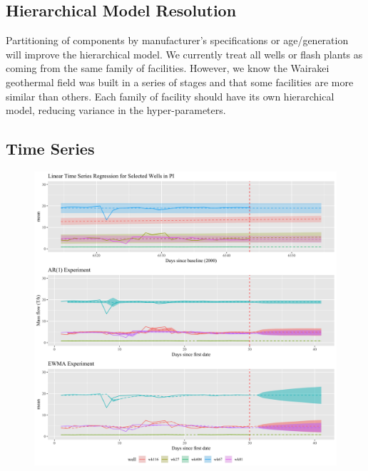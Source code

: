 \documentclass[a4paper, 12pt]{article}
\begin{document}
\subsection{Hierarchical Model Resolution}
Partitioning of components by manufacturer's specifications or age/generation will improve the hierarchical model. We currently treat all wells or flash plants as coming from the same family of facilities. However, we know the Wairakei geothermal field was built in a series of stages and that some facilities are more similar than others. Each family of facility should have its own hierarchical model, reducing variance in the hyper-parameters.

\newpage
\begin{appendices}
\section{Time Series}

\begin{figure}[h]
  \centering
  \includegraphics[width=\linewidth]{media/ts_experiment}
  \label{fig:ts_experiment}
\end{figure}


\end{appendices}
\end{document}
